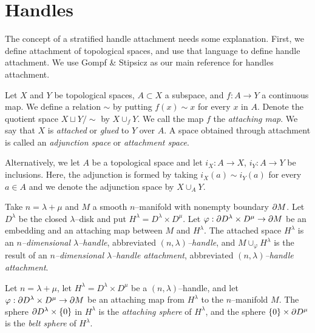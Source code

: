 \section{Handles}
\label{section:problem-handles}

The concept of a stratified handle attachment needs some explanation.
First, we define attachment of topological spaces, and use that language to define handle attachment.
We use Gompf \& Stipsicz \cite{GompStip} as our main reference for handles attachment.

\begin{defn}[Attachment]
	Let $X$ and $Y$ be topological spaces, $A\subset X$ a subspace, and $f:A\to Y$ a continuous map.
	We define a relation $\sim$ by putting $f(x)\sim x$ for every $x$ in $A$.
	Denote the quotient space $X\sqcup Y/\sim$ by $X\cup_f Y$.
	We call the map $f$ the \emph{attaching map}.  
	We say that $X$ is \emph{attached} or \emph{glued} to $Y$ over $A$.
	A space obtained through attachment is called an \emph{adjunction space} or \emph{attachment space}.
	
	Alternatively, we let $A$ be a topological space and let $i_X:A\to X$, $i_Y:A\to Y$ be inclusions.
	Here, the adjunction is formed by taking $i_X(a)\sim i_Y(a)$ for every $a\in A$ and we denote the adjunction space by $X\cup_A Y$.
\end{defn}

\begin{defn}[Handle]
	\label{def:handle}
	Take $n=\lambda+\mu$ and $M$ a smooth $n$--manifold with nonempty boundary $\partial M$.
	Let $D^\lambda$ be the closed $\lambda$--disk and put $H^\lambda = D^\lambda\times D^\mu$.
	Let $\varphi:\partial D^\lambda\times D^\mu\to\partial M$ be an embedding and an attaching map between $M$ and $H^\lambda$.
	The attached space $H^\lambda$ is an \emph{$n$--dimensional $\lambda$--handle}, abbreviated \emph{$(n,\lambda)$--handle}, and $M\cup_\varphi H^\lambda$ is the result of an \emph{$n$--dimensional $\lambda$--handle attachment}, abbreviated \emph{$(n,\lambda)$--handle attachment}.

	Let $n=\lambda+\mu$, let $H^\lambda=D^\lambda\times D^\mu$ be a $(n,\lambda)$--handle, and let $\varphi:\partial D^\lambda\times D^\mu\to\partial M$ be an attaching map from $H^\lambda$ to the $n$--manifold $M$.
	The sphere $\partial D^\lambda\times \{0\}$ in $H^\lambda$ is the \emph{attaching sphere} of $H^\lambda$, and the sphere $\{0\}\times \partial D^\mu$ is the \emph{belt sphere} of $H^\lambda$.	
\end{defn}

